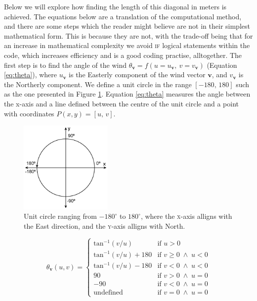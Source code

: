         Below we will explore how finding the length of this diagonal in meters is achieved. The equations below are a translation of the computational method, and there are some steps which the reader might believe are not in their simplest mathematical form. This is because they are not, with the trade-off being that for an increase in mathematical complexity we avoid \textsc{if} logical statements within the code, which increases efficiency and is a good coding practise, alltogether. The first step is to find the angle of the wind $\theta_{\mathbf{v}} = f(u = u_{\mathbf{v}},\: v = v_{\mathbf{v}})$ (Equation \ref{eq:theta}), where $u_{\mathbf{v}}$ is the Easterly component of the wind vector $\mathbf{v}$, and $v_{\mathbf{v}}$ is the Northerly component. We define a unit circle in the range $\left[ -180,\, 180 \right]$ such as the one presented in Figure \ref{fig:unitcircle}. Equation \ref{eq:theta} measures the angle between the x-axis and a line defined between the centre of the unit circle and a point with coordinates $P(x,y)=\left[u,\, v \right]$.

        \begin{figure}
            \centering
            \includegraphics[width=0.4\textwidth]{figures/atan2d_graphic.png}
            \caption{Unit circle ranging from $-180^\circ$ to $180^\circ$, where the \textsc{x}-axis alligns with the East direction, and the \textsc{y}-axis alligns with North.}
            \label{fig:unitcircle}
        \end{figure}
        
        \begin{equation}
        \label{eq:theta}
            \theta_{\mathbf{v}}(u, v) = 
            \begin{cases} 
                \text{tan}^{-1}\left(v/u\right)         & \text{if } u > 0 \\
                \text{tan}^{-1}\left(v/u\right)  + 180  & \text{if } v \geq 0 \; \wedge \; u < 0 \\
                \text{tan}^{-1}\left(v/u\right)  - 180  & \text{if } v < 0 \; \wedge \; u < 0 \\
                90                                              & \text{if } v > 0 \; \wedge \; u = 0 \\
                -90                                             & \text{if } v < 0 \; \wedge \; u = 0 \\
                \text{undefined}                                & \text{if } v = 0 \; \wedge \; u = 0
            \end{cases} 
        \end{equation}

